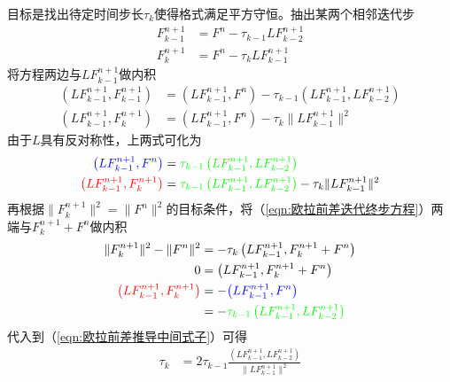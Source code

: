 \documentclass{ctexart}
\begin{document}
\begin{appendix}
目标是找出待定时间步长$\tau_k$使得格式满足平方守恒。抽出某两个相邻迭代步
\begin{align}
  F_{k-1}^{n+1} & = F^n - \tau_{k-1} L F_{k-2}^{n+1} \\
  F_k^{n+1} & = F^n - \tau_k L F_{k-1}^{n+1} \label{eqn:欧拉前差迭代终步方程}
\end{align}
将方程两边与$L F_{k-1}^{n+1}$做内积
\begin{align*}
  \left( L F_{k-1}^{n+1}, F_{k-1}^{n+1} \right) & = \left( L F_{k-1}^{n+1}, F^n \right) - \tau_{k-1} \left( L F_{k-1}^{n+1}, L F_{k-2}^{n+1} \right) \\
  \left( L F_{k-1}^{n+1}, F_k^{n+1} \right) & = \left( L F_{k-1}^{n+1}, F^n \right) - \tau_k \lVert L F_{k-1}^{n+1} \rVert^2
\end{align*}
由于$L$具有反对称性，上两式可化为
\begin{align}
  {\color{blue}\left( L F_{k-1}^{n+1}, F^n \right)} & = {\color{green}\tau_{k-1} \left( L F_{k-1}^{n+1}, L F_{k-2}^{n+1} \right)} \nonumber \\
  {\color{red}\left( L F_{k-1}^{n+1}, F_k^{n+1} \right)} & = {\color{green}\tau_{k-1} \left( L F_{k-1}^{n+1}, L F_{k-2}^{n+1} \right)} - \tau_k \lVert L F_{k-1}^{n+1} \rVert^2 \label{eqn:欧拉前差推导中间式子}
\end{align}
再根据$\lVert F_k^{n+1} \rVert^2 = \lVert F^n \rVert^2$的目标条件，将（\ref{eqn:欧拉前差迭代终步方程}）两端与$F_k^{n+1} + F^n$做内积
\begin{align*}
  \lVert F_k^{n+1} \rVert^2 - \lVert F^n \rVert^2 & = - \tau_k \left( L F_{k-1}^{n+1}, F_k^{n+1} + F^n \right) \\
  0 & = \left( L F_{k-1}^{n+1}, F_k^{n+1} + F^n \right) \\
  {\color{red}\left( L F_{k-1}^{n+1}, F_k^{n+1} \right)} & = - {\color{blue}\left( L F_{k-1}^{n+1}, F^n \right)} \\
  & = - {\color{green}\tau_{k-1} \left( L F_{k-1}^{n+1}, L F_{k-2}^{n+1} \right)}
\end{align*}
代入到（\ref{eqn:欧拉前差推导中间式子}）可得
\begin{align*}
  \tau_k & = 2 \tau_{k-1} \frac{\left( L F_{k-1}^{n+1}, L F_{k-2}^{n+1} \right)}{\lVert L F_{k-1}^{n+1} \rVert^2}
\end{align*}

\end{appendix}
\end{document}

